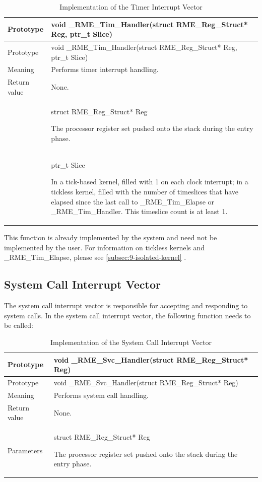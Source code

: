 \begin{xltabular}{\textwidth}{@{}>{\hsize\raggedright\arraybackslash}X>{\hsize\raggedright\arraybackslash}X@{}}
\caption{Implementation of the Timer Interrupt Vector}\label{tab:7-19-timer-interrupt-vector-implementation}\\
\toprule
Prototype & void \_RME\_Tim\_Handler(struct RME\_Reg\_Struct* Reg, ptr\_t
Slice)\tabularnewline
\endfirsthead
\toprule
Prototype & void \_RME\_Tim\_Handler(struct RME\_Reg\_Struct* Reg, ptr\_t
Slice)\tabularnewline
\midrule
\endhead
\bottomrule
\endlastfoot
Meaning & Performs timer interrupt handling.\tabularnewline
Return value & None.\tabularnewline
{} & struct RME\_Reg\_Struct* Reg

The processor register set pushed onto the stack during the entry phase.\strut
\tabularnewline
\strut
 & ptr\_t Slice

In a tick-based kernel, filled with 1 on each clock interrupt; in a tickless kernel, filled with the number of timeslices that have elapsed since the last call to \_RME\_Tim\_Elapse or \_RME\_Tim\_Handler. This timeslice count is at least 1.\strut
\tabularnewline
\end{xltabular}
\nopagebreak[4]

This function is already implemented by the system and need not be implemented by the user. For information on tickless kernels and \_RME\_Tim\_Elapse, please see \ref{subsec:9-isolated-kernel}
.

\subsection{System Call Interrupt Vector}\label{subsec:7-system-call-interrupt-vector}

The system call interrupt vector is responsible for accepting and responding to system calls. In the system call interrupt vector, the following function needs to be called:

\begin{xltabular}{\textwidth}{@{}>{\hsize\raggedright\arraybackslash}X>{\hsize\raggedright\arraybackslash}X@{}}
\caption{Implementation of the System Call Interrupt Vector}\label{tab:7-20-system-call-interrupt-vector-implementation}\\
\toprule
Prototype & void \_RME\_Svc\_Handler(struct RME\_Reg\_Struct*
Reg)\tabularnewline
\endfirsthead
\toprule
Prototype & void \_RME\_Svc\_Handler(struct RME\_Reg\_Struct*
Reg)\tabularnewline
\midrule
\endhead
\bottomrule
\endlastfoot
Meaning & Performs system call handling.\tabularnewline
Return value & None.\tabularnewline
Parameters\strut
 & struct RME\_Reg\_Struct* Reg

The processor register set pushed onto the stack during the entry phase.\strut
\tabularnewline
\end{xltabular}
\nopagebreak[4]

